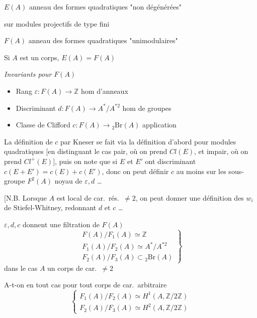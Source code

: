 \documentclass[11pt,a4paper]{article}
\begin{document}
$E(A)$ anneau des formes quadratiques "non dégénérées"

 sur modules projectifs de
type fini

$F(A)$ anneau des formes quadratiques "unimodulaires"


Si $A$ est un corps, $E(A) = F(A)$

\emph{Invariants pour} $F(A)$
\begin{itemize}
  \item[1°)] Rang \quad $\varepsilon : F(A) \longrightarrow \mathbb{Z}$
  \quad hom d'anneaux
  \item[2°)] Discriminant \quad $d : F(A) \longrightarrow A^{*}/A^{*2}$
  \quad hom de groupes
  \item[3°)] Classe de Clifford \quad $c : F(A) \longrightarrow
  {}_2\mathrm{Br}(A)$ \quad application
\end{itemize}

La définition de $c$ par Kneser se fait via la définition d'abord pour
 modules quadratiques [en distinguant le cas pair, où on
prend $Cl(E)$, et impair, où on prend $Cl^{+}(E)$], puis on note que si
$E$ et $E'$ ont  discriminant 
 $c(E + E') = c(E) + c(E')$, donc on peut définir
$c$ au moins sur les sous-groupe $F^2(A)$ noyau de $\varepsilon, d$
\ldots
{}

[N.B. Lorsque $A$ est local de car.\ rés.\ $\neq 2$, on peut donner une
définition des $w_i$ de Stiefel-Whitney, redonnant $d$ et $c$ \ldots


$\varepsilon, d, c$ donnent une filtration de $F(A)$
\[
\left.
\begin{array}{l}
F(A)/F_1(A) \simeq \mathbb{Z} \\
F_1(A)/F_2(A) \simeq A^{*}/A^{*2} \\
F_2(A)/F_3(A) \subset {}_2\mathrm{Br}(A)
\end{array}
\right\rbrace
\]
dans le cas $A$ un corps de car.\ $\neq 2$

 \quad A-t-on en tout cas pour tout corps de car.\
arbitraire
\[
\left\lbrace
\begin{array}{l}
F_1(A)/F_2(A) \simeq H^1(A, \mathbb{Z}/2\mathbb{Z}) \\
F_2(A)/F_3(A) \simeq H^2(A, \mathbb{Z}/2\mathbb{Z})
\end{array}
\right.
\]
\end{document}

